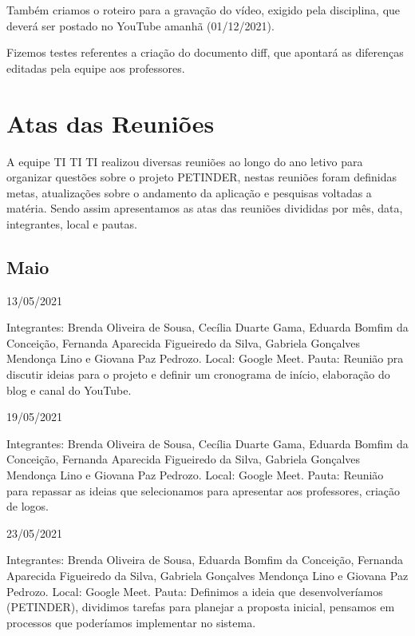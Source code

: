 \begin{apendicesenv}
\begin{flushleft}
Também criamos o roteiro para a gravação do vídeo, exigido pela disciplina, que deverá ser postado no \gls{YouTube} amanhã (01/12/2021).

Fizemos testes referentes a criação do documento diff, que apontará as diferenças editadas pela equipe aos professores.
\end{flushleft}

\chapter{Atas das Reuniões}
\label{atas-das-reunioes}
\begin{flushleft}
A equipe TI TI TI realizou diversas reuniões ao longo do ano letivo para organizar questões sobre o projeto PETINDER, nestas reuniões foram definidas metas, atualizações sobre o andamento da aplicação e pesquisas voltadas a matéria.
Sendo assim apresentamos as atas das reuniões divididas por mês, data, integrantes, local e pautas. 
\end{flushleft}

\begin{flushleft}
 \section{Maio}
 13/05/2021 

Integrantes: Brenda Oliveira de Sousa, Cecília Duarte Gama, Eduarda Bomfim da Conceição, Fernanda Aparecida Figueiredo da Silva, Gabriela Gonçalves Mendonça Lino e Giovana Paz Pedrozo.
\newline
Local: \gls{Google Meet}.
\newline
Pauta: Reunião pra discutir ideias para o projeto e definir um cronograma de início, elaboração do blog e canal do \gls{YouTube}.

19/05/2021 

Integrantes: Brenda Oliveira de Sousa, Cecília Duarte Gama, Eduarda Bomfim da Conceição, Fernanda Aparecida Figueiredo da Silva, Gabriela Gonçalves Mendonça Lino e Giovana Paz Pedrozo.
\newline
Local: \gls{Google Meet}.
\newline
Pauta:  Reunião para repassar as ideias que selecionamos para apresentar aos professores, criação de logos.


23/05/2021 

Integrantes: Brenda Oliveira de Sousa, Eduarda Bomfim da Conceição, Fernanda Aparecida Figueiredo da Silva, Gabriela Gonçalves Mendonça Lino e Giovana Paz Pedrozo.
\newline 
Local: \gls{Google Meet}.
 \newline
Pauta: Definimos a ideia que desenvolveríamos (PETINDER), dividimos tarefas para planejar a proposta inicial, pensamos em processos que poderíamos implementar no sistema.


\end{flushleft}
\end{apendicesenv}
